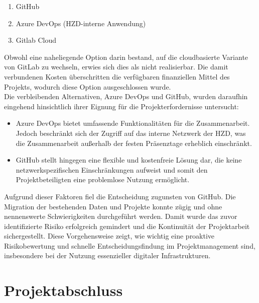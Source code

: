 \documentclass[12pt,oneside]{article}
\begin{document}
\begin{enumerate}
	\item GitHub
	\item Azure DevOps (HZD-interne Anwendung)
	\item Gitlab Cloud
\end{enumerate}

Obwohl eine naheliegende Option darin bestand, auf die cloudbasierte Variante von GitLab zu wechseln, erwies sich dies als nicht realisierbar. Die damit verbundenen Kosten überschritten die verfügbaren finanziellen Mittel des Projekts, wodurch diese Option ausgeschlossen wurde. \\

Die verbleibenden Alternativen, Azure DevOps und GitHub, wurden daraufhin eingehend hinsichtlich ihrer Eignung für die Projekterfordernisse untersucht:

\begin{itemize}
	\item Azure DevOps bietet umfassende Funktionalitäten für die Zusammenarbeit. Jedoch beschränkt sich der Zugriff auf das interne Netzwerk der HZD, was die Zusammenarbeit außerhalb der festen Präsenztage erheblich einschränkt.
	\item GitHub stellt hingegen eine flexible und kostenfreie Lösung dar, die keine netzwerkspezifischen Einschränkungen aufweist und somit den Projektbeteiligten eine problemlose Nutzung ermöglicht.
\end{itemize}

Aufgrund dieser Faktoren fiel die Entscheidung zugunsten von GitHub. Die Migration der bestehenden Daten und Projekte konnte zügig und ohne nennenswerte Schwierigkeiten durchgeführt werden. Damit wurde das zuvor identifizierte Risiko erfolgreich gemindert und die Kontinuität der Projektarbeit sichergestellt.
Diese Vorgehensweise zeigt, wie wichtig eine proaktive Risikobewertung und schnelle Entscheidungsfindung im Projektmanagement sind, insbesondere bei der Nutzung essenzieller digitaler Infrastrukturen.


\section{Projektabschluss}




\clearpage



\appendix
\end{document}
